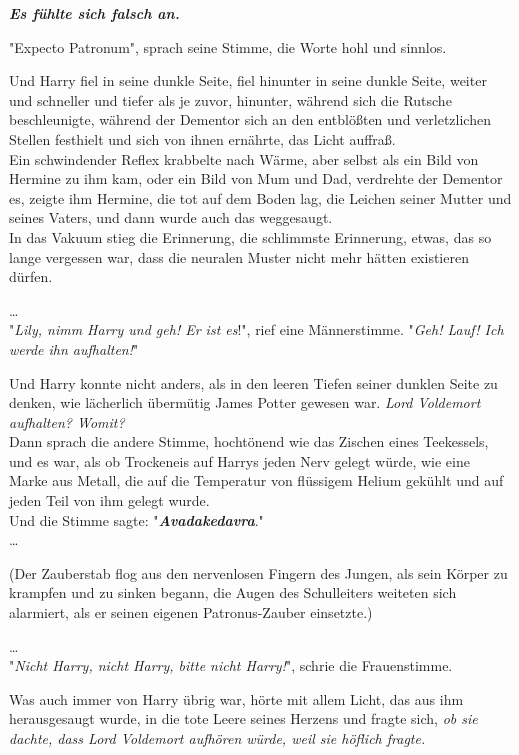 {\textbf{\emph{Es fühlte sich falsch an.}}

"Expecto Patronum", sprach seine Stimme, die Worte hohl und sinnlos.

Und Harry fiel in seine dunkle Seite, fiel hinunter in seine dunkle Seite, weiter und schneller und tiefer als je zuvor, hinunter, während sich die Rutsche beschleunigte, während der Dementor sich an den entblößten und verletzlichen Stellen festhielt und sich von ihnen ernährte, das Licht auffraß.\\ Ein schwindender Reflex krabbelte nach Wärme, aber selbst als ein Bild von Hermine zu ihm kam, oder ein Bild von Mum und Dad, verdrehte der Dementor es, zeigte ihm Hermine, die tot auf dem Boden lag, die Leichen seiner Mutter und seines Vaters, und dann wurde auch das weggesaugt.\\ In das Vakuum stieg die Erinnerung, die schlimmste Erinnerung, etwas, das so lange vergessen war, dass die neuralen Muster nicht mehr hätten existieren dürfen.

…\\ "\emph{Lily, nimm Harry und geh! Er ist es}!", rief eine Männerstimme. "\emph{Geh! Lauf! Ich werde ihn aufhalten!}"

Und Harry konnte nicht anders, als in den leeren Tiefen seiner dunklen Seite zu denken, wie lächerlich übermütig James Potter gewesen war. \emph{Lord Voldemort aufhalten? Womit?}\\ Dann sprach die andere Stimme, hochtönend wie das Zischen eines Teekessels, und es war, als ob Trockeneis auf Harrys jeden Nerv gelegt würde, wie eine Marke aus Metall, die auf die Temperatur von flüssigem Helium gekühlt und auf jeden Teil von ihm gelegt wurde.\\ Und die Stimme sagte: "\textbf{\emph{Avadakedavra}}."\\ …

(Der Zauberstab flog aus den nervenlosen Fingern des Jungen, als sein Körper zu krampfen und zu sinken begann, die Augen des Schulleiters weiteten sich alarmiert, als er seinen eigenen Patronus-Zauber einsetzte.)

…\\ "\emph{Nicht Harry, nicht Harry, bitte nicht Harry!}", schrie die Frauenstimme.

Was auch immer von Harry übrig war, hörte mit allem Licht, das aus ihm herausgesaugt wurde, in die tote Leere seines Herzens und fragte sich, \emph{ob sie dachte, dass Lord Voldemort aufhören würde, weil sie höflich fragte.}

}
